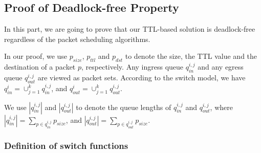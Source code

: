 \subsection{Proof of Deadlock-free Property}\label{subsec:proof}
In this part, we are going to prove that our TTL-based solution is deadlock-free regardless of the packet scheduling algorithms.

In our proof, we use $p_{size}$, $p_{ttl}$ and $p_{dst}$ to denote the size, the TTL value and the destination of a packet $p$, respectively. Any ingress queue $q_{in}^{i,j}$ and any egress queue $q_{out}^{i,j}$ are viewed as packet sets. According to the switch model, we have $q_{in}^{i}=\cup_{j=1}^{k}q_{in}^{i,j}$, and $q_{out}^{i}=\cup_{j=1}^{k}q_{out}^{i,j}$.

We use $|q_{in}^{i,j}|$ and $|q_{out}^{i,j}|$ to denote the queue lengths of $q_{in}^{i,j}$ and $q_{out}^{i,j}$, where $|q_{in}^{i,j}|=\sum_{p\in q_{in}^{i,j}}p_{size}$, and $|q_{out}^{i,j}|=\sum_{p\in q_{out}^{i,j}}p_{size}$.
\subsubsection{Definition of switch functions}
 
